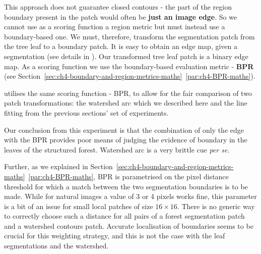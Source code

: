 This approach does not guarantee closed contours - the part of the region boundary present in the patch would often be {\bf just an image edge}. So we cannot use as a scoring function a region metric but must instead use a boundary-based one. We must, therefore, transform the segmentation patch from the tree leaf to a boundary patch. It is easy to obtain an edge map, given a segmentation (see details in ). Our transformed tree leaf patch is a binary edge map. As a scoring function we use the boundary-based evaluation metric - {\bf BPR} (see Section~\ref*{sec:ch4-boundary-and-region-metrics-maths}~\ref{par:ch4-BPR-maths}).

 utilises the same scoring function - BPR, to allow for the fair comparison of two patch transformations: the watershed arc which we described here and the line fitting from the previous sections' set of experiments. 

Our conclusion from this experiment is that the combination of only the edge with the BPR provides poor means of judging the evidence of boundary in the leaves of the structured forest. Watershed arc is a very brittle cue {\it per se}. %

Further, as we explained in Section~\ref*{sec:ch4-boundary-and-region-metrics-maths}~\ref{par:ch4-BPR-maths}, BPR is parametrised on the pixel distance threshold for which a match between the two segmentation boundaries is to be made. While for natural images a value of 3 or 4 pixels works fine, this parameter is a bit of an issue for small local patches of size $16\times 16$. There is no generic way to correctly choose such a distance for all pairs of a forest segmentation patch and a watershed contours patch. Accurate localisation of boundaries seems to be crucial for this weighting strategy, and this is not the case with the leaf segmentations and the watershed.

